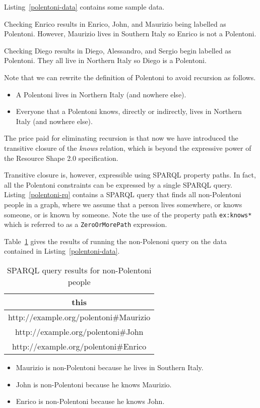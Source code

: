 \documentclass{article}
\begin{document}
Listing~\ref{polentoni-data} contains some sample data.


Checking Enrico results in Enrico, John, and Maurizio being labelled as Polentoni. 
However, Maurizio lives in Southern Italy so Enrico is not a Polentoni.

Checking Diego results in Diego, Alessandro, and Sergio begin labelled as Polentoni.
They all live in Northern Italy so Diego is a Polentoni.

Note that we can rewrite the definition of Polentoni to avoid recursion as follows.
\begin{itemize}
\item A Polentoni lives in Northern Italy (and nowhere else).
\item Everyone that a Polentoni knows, directly or indirectly, lives in Northern Italy (and nowhere else).
\end{itemize}
The price paid for eliminating recursion is that now we have introduced the transitive closure of the {\em knows} relation, which is beyond the expressive power of the Resource Shape 2.0 specification.

Transitive closure is, however, expressible using SPARQL property paths.
In fact, all the Polentoni constraints can be expressed by a single SPARQL query.
Listing~\ref{polentoni-rq} contains a SPARQL query that finds all non-Polentoni people in a graph,
where we assume that a person lives somewhere, or knows someone, or is known by someone.
Note the use of the property path {\tt ex:knows*} which is referred to as a {\tt ZeroOrMorePath} expression.


Table~\ref{polentoni-results} gives the results of running the non-Polenoni query on the data contained in Listing~\ref{polentoni-data}.
\begin{table}[h]
\begin{center}
\begin{tt}
\begin{tabular}{|c|}
\hline
this \\
\hline
http://example.org/polentoni\#Maurizio \\
http://example.org/polentoni\#John \\
http://example.org/polentoni\#Enrico \\
\hline
\end{tabular}
\end{tt}
\end{center}
\caption{SPARQL query results for non-Polentoni people}
\label{polentoni-results}
\end{table}
\begin{itemize}
\item Maurizio is non-Polentoni because he lives in Southern Italy.
\item John is non-Polentoni because he knows Maurizio.
\item Enrico is non-Polentoni because he knows John.
\end{itemize}
\end{document}
